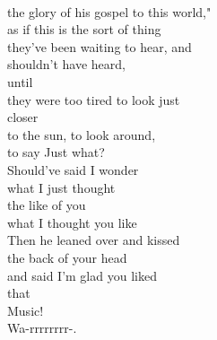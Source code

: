 \documentclass[smalldemyvopaper,11pt,twoside,onecolumn,openright,extrafontsizes]{memoir}
\begin{document}
\\the glory of his gospel to this world,"
\\as if this is the sort of thing
\\they've been waiting to hear, and
\\shouldn't have heard,
\\until
\\they were too tired to look just
\\closer
\\to the sun, to look around,
\\to say Just what?
\\Should've said I wonder
\\what I just thought
\\the like of you
\\what I thought you like
\\Then he leaned over and kissed
\\the back of your head
\\and said I'm glad you liked
\\that
\\Music!
\\Wa-rrrrrrrr-.
\end{document}
